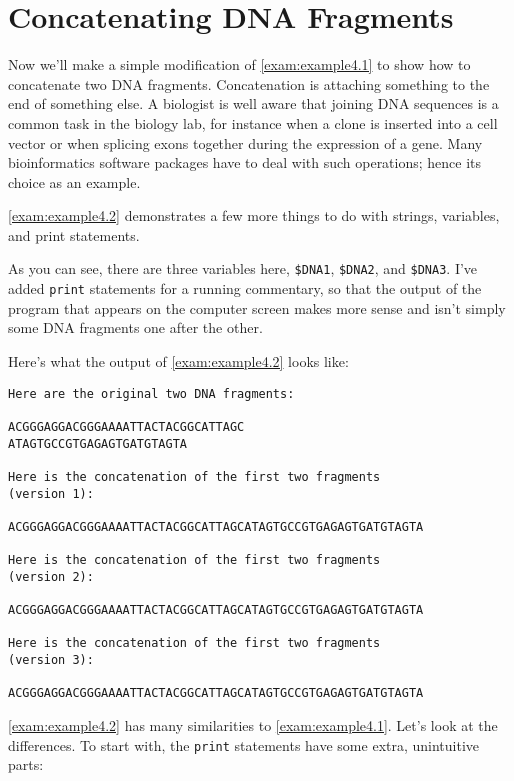 \section{Concatenating DNA Fragments}
Now we'll make a simple modification of \autoref{exam:example4.1} to show how to concatenate two DNA fragments. Concatenation is attaching something to the end of something else. A biologist is well aware that joining DNA sequences is a common task in the biology lab, for instance when a clone is inserted into a cell vector or when splicing exons together during the expression of a gene. Many bioinformatics software packages have to deal with such operations; hence its choice as an example.

\autoref{exam:example4.2} demonstrates a few more things to do with strings, variables, and print statements. 



As you can see, there are three variables here, \verb|$DNA1|, \verb|$DNA2|, and \verb|$DNA3|. I've added \verb|print| statements for a running commentary, so that the output of the program that appears on the computer screen makes more sense and isn't simply some DNA fragments one after the other.

Here's what the output of \autoref{exam:example4.2} looks like:

\begin{lstlisting}
Here are the original two DNA fragments:

ACGGGAGGACGGGAAAATTACTACGGCATTAGC
ATAGTGCCGTGAGAGTGATGTAGTA

Here is the concatenation of the first two fragments
(version 1):

ACGGGAGGACGGGAAAATTACTACGGCATTAGCATAGTGCCGTGAGAGTGATGTAGTA

Here is the concatenation of the first two fragments
(version 2):

ACGGGAGGACGGGAAAATTACTACGGCATTAGCATAGTGCCGTGAGAGTGATGTAGTA

Here is the concatenation of the first two fragments
(version 3):

ACGGGAGGACGGGAAAATTACTACGGCATTAGCATAGTGCCGTGAGAGTGATGTAGTA
\end{lstlisting}

\autoref{exam:example4.2} has many similarities to
\autoref{exam:example4.1}. Let's look at the differences. To start with, the \verb|print| statements have some extra, unintuitive parts:

